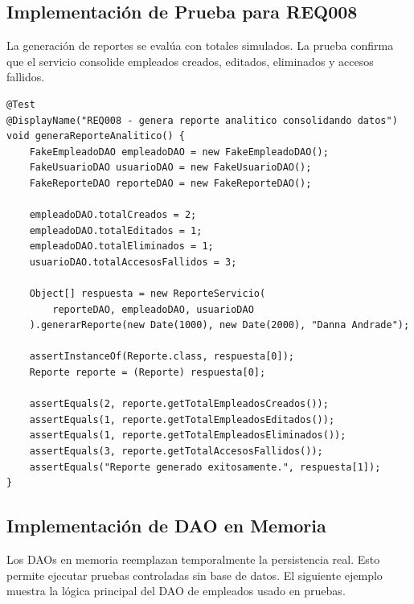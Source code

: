 \documentclass[12pt,a4paper]{article}
\begin{document}
\subsection{Implementación de Prueba para REQ008}

La generación de reportes se evalúa con totales simulados. La prueba confirma que el servicio consolide empleados creados, editados, eliminados y accesos fallidos.

\begin{lstlisting}[style=javaStyle, caption={Prueba de generación de reporte analítico}]
@Test
@DisplayName("REQ008 - genera reporte analitico consolidando datos")
void generaReporteAnalitico() {
    FakeEmpleadoDAO empleadoDAO = new FakeEmpleadoDAO();
    FakeUsuarioDAO usuarioDAO = new FakeUsuarioDAO();
    FakeReporteDAO reporteDAO = new FakeReporteDAO();

    empleadoDAO.totalCreados = 2;
    empleadoDAO.totalEditados = 1;
    empleadoDAO.totalEliminados = 1;
    usuarioDAO.totalAccesosFallidos = 3;

    Object[] respuesta = new ReporteServicio(
        reporteDAO, empleadoDAO, usuarioDAO
    ).generarReporte(new Date(1000), new Date(2000), "Danna Andrade");

    assertInstanceOf(Reporte.class, respuesta[0]);
    Reporte reporte = (Reporte) respuesta[0];

    assertEquals(2, reporte.getTotalEmpleadosCreados());
    assertEquals(1, reporte.getTotalEmpleadosEditados());
    assertEquals(1, reporte.getTotalEmpleadosEliminados());
    assertEquals(3, reporte.getTotalAccesosFallidos());
    assertEquals("Reporte generado exitosamente.", respuesta[1]);
}
\end{lstlisting}

\subsection{Implementación de DAO en Memoria}

Los DAOs en memoria reemplazan temporalmente la persistencia real. Esto permite ejecutar pruebas controladas sin base de datos. El siguiente ejemplo muestra la lógica principal del DAO de empleados usado en pruebas.
\end{document}
